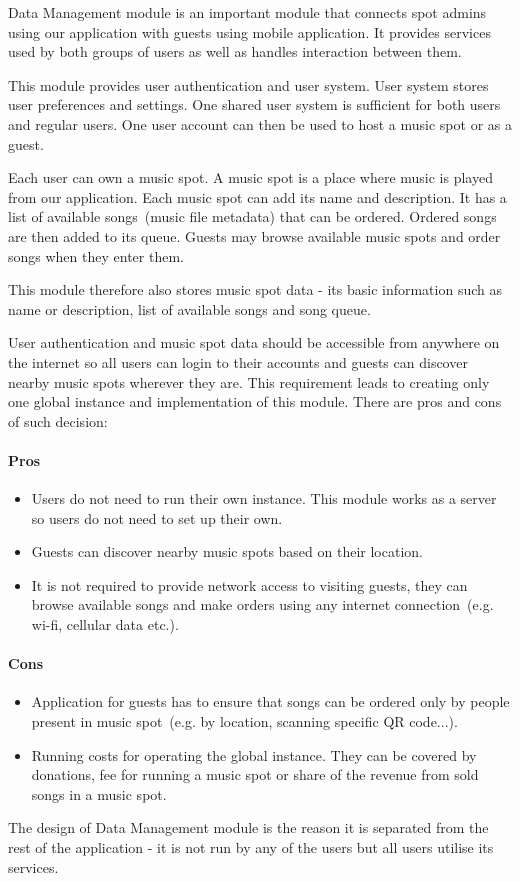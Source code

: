 Data Management module is an important module that connects spot admins using our application with guests using mobile application. It provides services used by both groups of users as well as handles interaction between them.
\par
This module provides user authentication and user system. User system stores user preferences and settings. One shared user system is sufficient for both users and regular users. One user account can then be used to host a music spot or as a guest.
\par
Each user can own a music spot. A music spot is a place where music is played from our application. Each music spot can add its name and description. It has a list of available songs~(music file metadata) that can be ordered. Ordered songs are then added to its queue. Guests may browse available music spots and order songs when they enter them.
\par
This module therefore also stores music spot data - its basic information such as name or description, list of available songs and song queue.
\par
User authentication and music spot data should be accessible from anywhere on the internet so all users can login to their accounts and guests can discover nearby music spots wherever they are. This requirement leads to creating only one global instance and implementation of this module. There are pros and cons of such decision:
\paragraph{Pros}
\begin{itemize}
\item Users do not need to run their own instance. This module works as a server so users do not need to set up their own.
\item Guests can discover nearby music spots based on their location.
\item It is not required to provide network access to visiting guests, they can browse available songs and make orders using any internet connection~(e.g. wi-fi, cellular data etc.).
\end{itemize}

\paragraph{Cons}
\begin{itemize}
\item Application for guests has to ensure that songs can be ordered only by people present in music spot~(e.g. by location, scanning specific QR code...).
\item Running costs for operating the global instance. They can be covered by donations, fee for running a music spot or share of the revenue from sold songs in a music spot.
\end{itemize}
\par
The design of Data Management module is the reason it is separated from the rest of the application - it is not run by any of the users but all users utilise its services.


